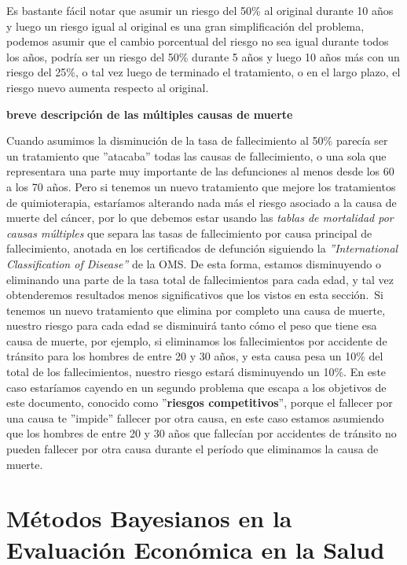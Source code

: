 \documentclass[12pt]{article}
\begin{document}
Es bastante fácil notar que asumir un riesgo del 50\% al original durante 10 años y luego un riesgo igual al original es una gran simplificación del problema, podemos asumir que el cambio porcentual del riesgo no sea igual durante todos los años, podría ser un riesgo del 50\% durante 5 años y luego 10 años más con un riesgo del 25\%, o tal vez luego de terminado el tratamiento, o en el largo plazo, el riesgo nuevo aumenta respecto al original.\\




\begin{center}
    \textbf{breve descripción de las múltiples causas de muerte}
\end{center}

Cuando asumimos la disminución de la tasa de fallecimiento al 50\% parecía ser un tratamiento que ''atacaba'' todas las causas de fallecimiento, o una sola que representara una parte muy importante de las defunciones al menos desde los 60 a los 70 años. Pero si tenemos un nuevo tratamiento que mejore los tratamientos de quimioterapia, estaríamos alterando nada más el riesgo asociado a la causa de muerte del cáncer, por lo que debemos estar usando las \textit{tablas de mortalidad por causas múltiples} que separa las tasas de fallecimiento por causa principal de fallecimiento, anotada en los certificados de defunción siguiendo la \textit{''International Classification of Disease''} de la OMS. De esta forma, estamos disminuyendo o eliminando una parte de la tasa total de fallecimientos para cada edad, y tal vez obtenderemos resultados menos significativos que los vistos en esta sección.\
Si tenemos un nuevo tratamiento que elimina por completo una causa de muerte, nuestro riesgo para cada edad se disminuirá tanto cómo el peso que tiene esa causa de muerte, por ejemplo, si eliminamos los fallecimientos por accidente de tránsito para los hombres de entre 20 y 30 años, y esta causa pesa un 10\% del total de los fallecimientos, nuestro riesgo estará disminuyendo un 10\%. En este caso estaríamos cayendo en un segundo problema que escapa a los objetivos de este documento, conocido como ''\textbf{riesgos competitivos}'', porque el fallecer por una causa te ''impide'' fallecer por otra causa, en este caso estamos asumiendo que los hombres de entre 20 y 30 años que fallecían por accidentes de tránsito no pueden fallecer por otra causa durante el período que eliminamos la causa de muerte.

\section{Métodos Bayesianos en la Evaluación Económica en la Salud}
\end{document}
